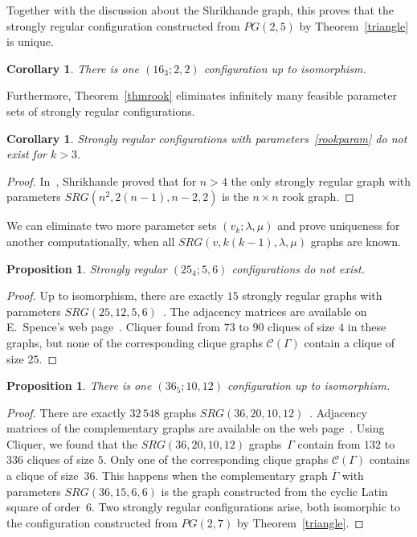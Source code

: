 \documentclass[12pt, reqno]{amsart}
\newtheorem{proposition}[theorem]{Proposition}
\newtheorem{corollary}[theorem]{Corollary}
\def\C{\mathcal{C}}
\begin{document}
Together with the discussion about the Shrikhande graph, this proves that
the strongly regular configuration constructed from $PG(2,5)$ by Theorem~\ref{triangle}
is unique.

\begin{corollary}\label{src16}
There is one $(16_3;2,2)$ configuration up to isomorphism.
\end{corollary}

Furthermore, Theorem~\ref{thmrook} eliminates infinitely many feasible parameter sets of
strongly regular configurations.

\begin{corollary}\label{norook}
Strongly regular configurations with parameters~\eqref{rookparam} do not
exist for $k>3$.
\end{corollary}

\begin{proof}
In~\cite{SSS59}, Shrikhande proved that for $n>4$ the only strongly regular
graph with parameters $SRG(n^2,2(n-1),n-2,2)$ is the $n\times n$ rook graph.
\end{proof}

We can eliminate two more parameter sets $(v_k;\lambda,\mu)$ and prove uniqueness for another
computationally, when all $SRG(v,k(k-1),\lambda,\mu)$ graphs are known.

\begin{proposition}\label{non25-4}
Strongly regular $(25_4;5,6)$ configurations do not exist.
\end{proposition}

\begin{proof}
Up to isomorphism, there are exactly $15$ strongly regular graphs with parameters
$SRG(25,12,5,6)$~\cite{AP73, MR73}. The adjacency matrices are available on
E.~Spence's web page~\cite{ES}. Cliquer found from $73$ to $90$ cliques of
size $4$ in these graphs, but none of the corresponding clique graphs
$\C(\Gamma)$ contain a clique of size $25$.
\end{proof}

\begin{proposition}\label{src36}
There is one $(36_5;10,12)$ configuration up to isomorphism.
\end{proposition}

\begin{proof}
There are exactly $32\,548$ graphs $SRG(36,20,10,12)$~\cite{MS01}. Adjacency
matrices of the complementary graphs are available on the web page~\cite{ES}.
Using Cliquer, we found that the $SRG(36,20,10,12)$ graphs~$\Gamma$ contain
from $132$ to $336$ cliques of size $5$. Only one of the corresponding clique
graphs $\C(\Gamma)$ contains a clique of size~$36$. This happens when the
complementary graph $\overline{\Gamma}$ with parameters $SRG(36,15,6,6)$ is
the graph constructed from the cyclic Latin square of order~$6$. Two
strongly regular configurations arise, both isomorphic to the configuration
constructed from $PG(2,7)$ by Theorem~\ref{triangle}.
\end{proof}
\end{document}
